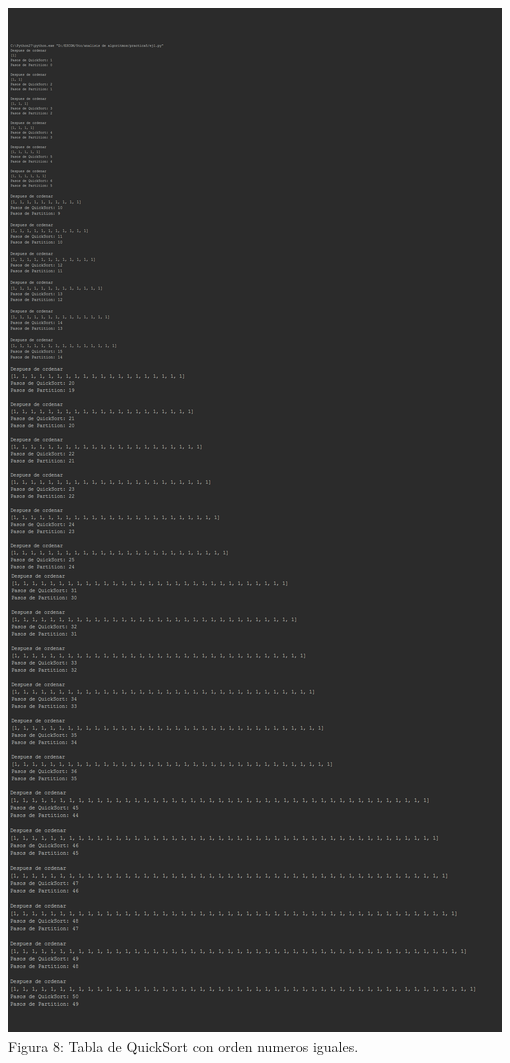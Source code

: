\documentclass[spanish]{article}
\begin{document}
 \begin{center}
	\includegraphics[scale=.5]{./imagenes/anexos.png}\\
		Figura 8: Tabla de QuickSort con orden numeros iguales.
	\end{center}

	\bigskip
\end{document}

